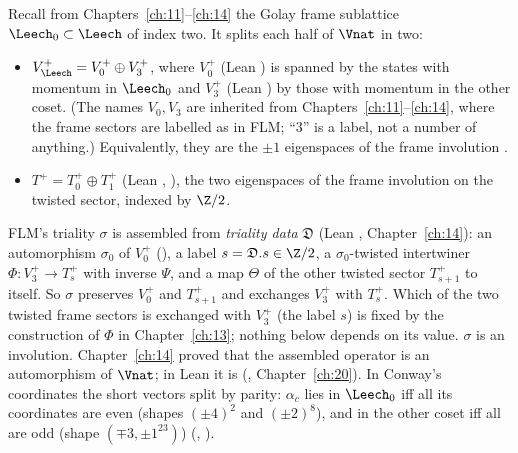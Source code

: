 Recall from Chapters~\ref{ch:11}--\ref{ch:14} the Golay frame sublattice $\Leech_0\subset\Leech$ of index two.  It splits
each half of $\Vnat$ in two:
\begin{itemize}
\item $V_\Leech^+=V_0^+\oplus V_3^+$, where $V_0^+$ (Lean ) is spanned by the states with momentum in
  $\Leech_0$ and $V_3^+$ (Lean ) by those with momentum in the other coset.  (The names $V_0,V_3$ are
  inherited from Chapters~\ref{ch:11}--\ref{ch:14}, where the frame sectors are labelled as in FLM; ``3'' is a label, not
  a number of anything.)  Equivalently, they are the $\pm1$ eigenspaces of the frame involution .
\item $T^+=T_0^+\oplus T_1^+$ (Lean , ), the two eigenspaces of the frame involution on the
  twisted sector, indexed by $\Z/2$.
\end{itemize}
FLM's triality $\sigma$ is assembled from \emph{triality data} $\mathfrak D$ (Lean , Chapter~\ref{ch:14}):
an automorphism $\sigma_0$ of $V_0^+$ (), a label $s=\mathfrak D.s\in\Z/2$, a $\sigma_0$-twisted intertwiner
$\Phi:V_3^+\to T_s^+$ with inverse $\Psi$, and a map $\Theta$ of the other twisted sector $T_{s+1}^+$ to itself.  So $\sigma$
preserves $V_0^+$ and $T_{s+1}^+$ and exchanges $V_3^+$ with $T_s^+$.  Which of the two twisted frame sectors is exchanged
with $V_3^+$ (the label $s$) is fixed by the construction of $\Phi$ in Chapter~\ref{ch:13}; nothing below depends on its
value.  $\sigma$ is an involution.  Chapter~\ref{ch:14} proved that the assembled operator is an
automorphism of $\Vnat$; in Lean it is  (,
Chapter~\ref{ch:20}).  In Conway's coordinates the short vectors split by parity: $\alpha_c$ lies in $\Leech_0$ iff all its
coordinates are even (shapes $(\pm4)^2$ and $(\pm2)^8$), and in the other coset iff all are odd (shape
$(\mp3,\pm1^{23})$) (, ).

